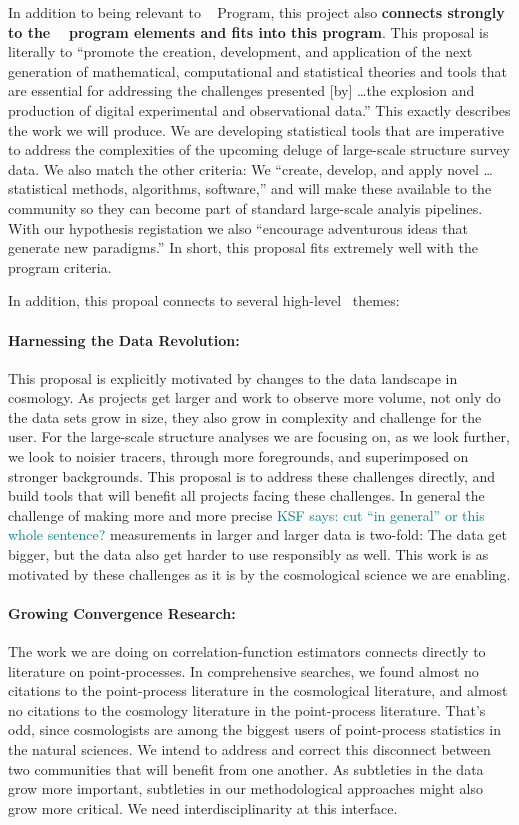 \documentclass[12pt, fullpage, letterpaper]{article}
\newcommand{\KSF}[1]{\textcolor{teal}{KSF says: #1}}
\begin{document}
In addition to being relevant to \NSF\  Program, this
project also \textbf{connects strongly to the \NSF\ 
program elements and fits into this program}.
This proposal is literally to ``promote the creation,
development, and application of the next generation of mathematical,
computational and statistical theories and tools that are essential
for addressing the challenges presented [by] \ldots the explosion and production of digital
experimental and observational data.'' This exactly describes the work we will produce.
We are developing statistical tools that are imperative to address the complexities of the upcoming deluge of large-scale structure survey data.
We also match the other  criteria:
We ``create, develop, and apply novel \ldots statistical methods, algorithms, software,'' and will make these available to the community so they can become part of standard large-scale analyis pipelines.
With our hypothesis registation we also ``encourage adventurous ideas that generate
new paradigms.'' In short, this proposal fits extremely well with the  program
criteria.

In addition, this propoal connects to several high-level \NSF\ themes:

\paragraph{Harnessing the Data Revolution:}
This proposal is explicitly motivated by changes to the data landscape
in cosmology.  As projects get larger and work to observe more volume,
not only do the data sets grow in size, they also grow in complexity
and challenge for the user.  For the large-scale structure analyses we are focusing on, as we look further, we look
to noisier tracers, through more foregrounds, and superimposed on
stronger backgrounds. This proposal is to address these challenges
directly, and build tools that will benefit all projects facing these
challenges.  In general the challenge of making more and more precise
\KSF{cut ``in general'' or this whole sentence?}
measurements in larger and larger data is two-fold: The data get
bigger, but the data also get harder to use responsibly as well. This
work is as motivated by these challenges as it is by the cosmological
science we are enabling.

\paragraph{Growing Convergence Research:}
The work we are doing on correlation-function estimators connects
directly to literature on point-processes. In comprehensive searches, we found almost no citations to the point-process
literature in the cosmological literature, and almost no citations to
the cosmology literature in the point-process literature. That's odd,
since cosmologists are among the biggest users of point-process
statistics in the natural sciences. We intend to address and correct
this disconnect between two communities that will benefit
from one another. As subtleties in the data grow more important,
subtleties in our methodological approaches might also grow more
critical. We need interdisciplinarity at this interface.
\end{document}

